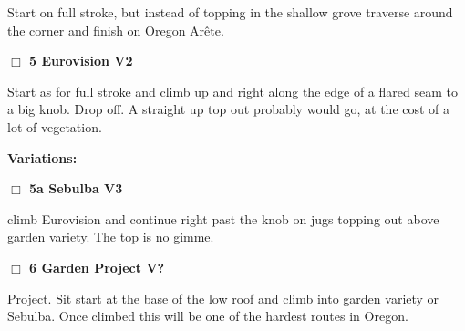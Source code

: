 \begin{multicols}{2}
\begin{adjustwidth}{0.5cm}{}
\begin{adjustwidth}{1.3em}{}
Start on full stroke, but instead of topping in the shallow grove traverse around the corner and finish on Oregon Arête.
\end{adjustwidth}



\end{adjustwidth}


\needspace{2em}
\label{rt:Eurovision}
\colorbox{green!20}{
\parbox{0.95\linewidth}{
\hspace{-1ex}\textbf{$\Box$
5 Eurovision V2  
}}}
\begin{adjustwidth}{1.3em}{}			

Start as for full stroke and climb up and right along the edge of a flared seam to a big knob. Drop off. A straight up top out probably would go, at the cost of a lot of vegetation.
\end{adjustwidth}


\begin{adjustwidth}{0.5cm}{}				
\needspace{4em}
\textbf{Variations:} \newline

\needspace{2em}
\label{vr:Sebulba}
\colorbox{green!20}{
\parbox{0.95\linewidth}{
\hspace{-1ex}\textbf{$\Box$
5a Sebulba V3  \warn
}}}
\begin{adjustwidth}{1.3em}{}			

climb Eurovision and continue right past the knob on jugs topping out above garden variety. The top is no gimme.
\end{adjustwidth}



\end{adjustwidth}


\needspace{2em}
\label{rt:Garden Project}
\colorbox{black!20}{
\parbox{0.95\linewidth}{
\hspace{-1ex}\textbf{$\Box$
6 Garden Project V?  
}}}
\begin{adjustwidth}{1.3em}{}			

Project. Sit start at the base of the low roof and climb into garden variety or Sebulba. Once climbed this will be one of the hardest routes in Oregon.
\end{adjustwidth}



	\end{multicols}
\label{tp:arboretum2}
  \begin{landscape}
	
  \end{landscape}

